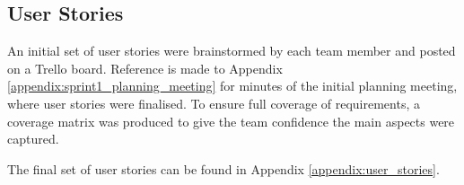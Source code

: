\subsection{User Stories}

An initial set of user stories were brainstormed by each team member and posted on a Trello board. 
Reference is made to Appendix \ref{appendix:sprint1_planning_meeting} for minutes of the initial planning meeting, where user stories were finalised.
To ensure full coverage of requirements, a  coverage matrix was produced to give the team confidence the main aspects were captured.

The final set of user stories can be found in Appendix \ref{appendix:user_stories}.